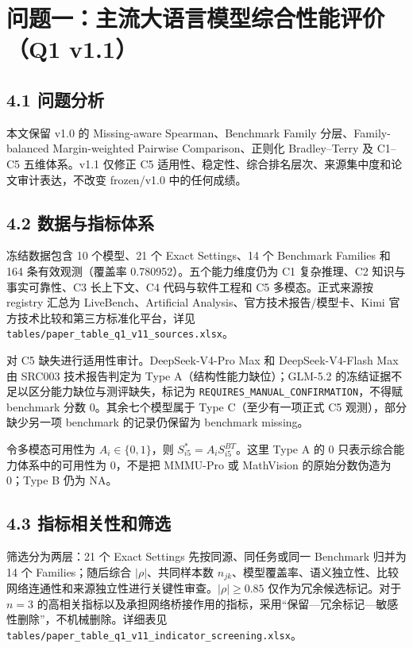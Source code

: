 \section{问题一：主流大语言模型综合性能评价（Q1 v1.1）}

\subsection{4.1 问题分析}
本文保留 v1.0 的 Missing-aware Spearman、Benchmark Family 分层、Family-balanced Margin-weighted Pairwise Comparison、正则化 Bradley--Terry 及 C1--C5 五维体系。v1.1 仅修正 C5 适用性、稳定性、综合排名层次、来源集中度和论文审计表达，不改变 frozen/v1.0 中的任何成绩。

\subsection{4.2 数据与指标体系}
冻结数据包含 10 个模型、21 个 Exact Settings、14 个 Benchmark Families 和 164 条有效观测（覆盖率 0.780952）。五个能力维度仍为 C1 复杂推理、C2 知识与事实可靠性、C3 长上下文、C4 代码与软件工程和 C5 多模态。正式来源按 registry 汇总为 LiveBench、Artificial Analysis、官方技术报告/模型卡、Kimi 官方技术比较和第三方标准化平台，详见 \texttt{tables/paper\_table\_q1\_v11\_sources.xlsx}。

对 C5 缺失进行适用性审计。DeepSeek-V4-Pro Max 和 DeepSeek-V4-Flash Max 由 SRC003 技术报告判定为 Type A（结构性能力缺位）；GLM-5.2 的冻结证据不足以区分能力缺位与测评缺失，标记为 \texttt{REQUIRES\_MANUAL\_CONFIRMATION}，不得赋 benchmark 分数 0。其余七个模型属于 Type C（至少有一项正式 C5 观测），部分缺少另一项 benchmark 的记录仍保留为 benchmark missing。

令多模态可用性为 $A_i\in\{0,1\}$，则 $S_{i5}^{*}=A_iS_{i5}^{BT}$。这里 Type A 的 0 只表示综合能力体系中的可用性为 0，不是把 MMMU-Pro 或 MathVision 的原始分数伪造为 0；Type B 仍为 NA。

\subsection{4.3 指标相关性和筛选}
筛选分为两层：21 个 Exact Settings 先按同源、同任务或同一 Benchmark 归并为 14 个 Families；随后综合 $|\rho|$、共同样本数 $n_{jk}$、模型覆盖率、语义独立性、比较网络连通性和来源独立性进行关键性审查。$|\rho|\ge0.85$ 仅作为冗余候选标记。对于 $n=3$ 的高相关指标以及承担网络桥接作用的指标，采用“保留—冗余标记—敏感性删除”，不机械删除。详细表见 \texttt{tables/paper\_table\_q1\_v11\_indicator\_screening.xlsx}。

